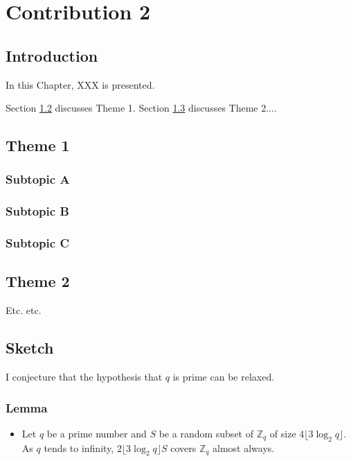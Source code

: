 
\chapter{Contribution 2}\label{chap:contrib2}

\section{Introduction}

In this Chapter, XXX is presented.

Section \ref{sec:contrib2:theme1} discusses Theme 1. Section \ref{sec:contrib2:theme2} discusses Theme 2....

\section{Theme 1}\label{sec:contrib2:theme1}

\subsection{Subtopic A}\label{sec:contrib2:theme1:A}

\subsection{Subtopic B}\label{sec:contrib2:theme1:B}

\subsection{Subtopic C}\label{sec:contrib2:theme1:C}

\section{Theme 2}\label{sec:contrib2:theme2}

Etc. etc.

\section{Sketch} 
I conjecture that the hypothesis that $q$ is prime can be relaxed.
\subsection{Lemma}
\begin{itemize}
    \item Let $q$ be a prime number and $S$ be a random subset of $\mathbb{Z}_q$ of size $4\lfloor3\log_2 q\rfloor$. As $q$ tends to infinity, $2\lfloor3\log_2 q\rfloor S$ covers $\mathbb{Z}_q$ almost always. 
\end{itemize}

